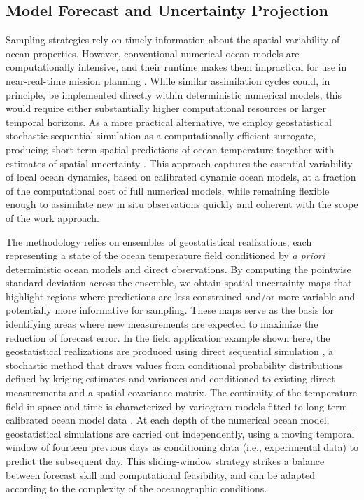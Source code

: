 \subsection{Model Forecast and Uncertainty Projection}

Sampling strategies rely on timely information about the spatial
variability of ocean properties. However, conventional numerical ocean
models are computationally intensive, and their runtime makes them
impractical for use in near-real-time mission planning . While similar assimilation cycles could, in
principle, be implemented directly within deterministic numerical
models, this would require either substantially higher computational
resources or larger temporal horizons. As a more practical
alternative, we employ geostatistical stochastic sequential simulation
as a computationally efficient surrogate, producing short-term spatial
predictions of ocean temperature together with estimates of spatial
uncertainty \cite{deutsch1992}. This approach captures the essential
variability of local ocean dynamics, based on calibrated dynamic ocean
models, at a fraction of the computational cost of full numerical
models, while remaining flexible enough to assimilate new in situ
observations quickly \cite{Duarte2025} and coherent with the scope of
the work approach.

The methodology relies on ensembles of geostatistical realizations,
each representing a state of the ocean temperature field conditioned
by \emph{a priori} deterministic ocean models \cite{CMEMS2017} and
direct observations. By computing the pointwise standard deviation
across the ensemble, we obtain spatial uncertainty maps that highlight
regions where predictions are less constrained and/or more variable
and potentially more informative for sampling. These maps serve as the
basis for identifying areas where new measurements are expected to
maximize the reduction of forecast error. In the field application
example shown here, the geostatistical realizations are produced using
direct sequential simulation \cite{soares2001direct}, a stochastic
method that draws values from conditional probability distributions
defined by kriging estimates and variances and conditioned to existing
direct measurements and a spatial covariance matrix. The continuity of
the temperature field in space and time is characterized by variogram
models fitted to long-term calibrated ocean model data
\cite{CMEMS2017}. At each depth of the numerical ocean model,
geostatistical simulations are carried out independently, using a
moving temporal window of fourteen previous   days as conditioning data
(i.e., experimental data) to predict the subsequent day. This
sliding-window strategy strikes a balance between forecast skill and
computational feasibility, and can be adapted according to the
complexity of the oceanographic conditions.

